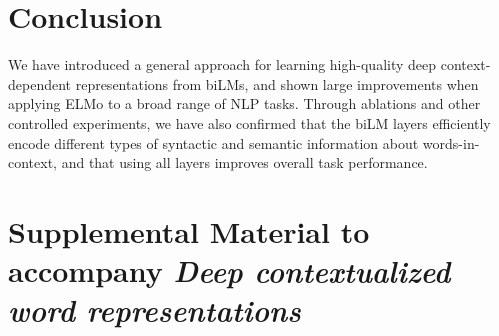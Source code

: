 \documentclass[11pt,a4paper]{article}
\newcommand{\ELMO}{ELMo}
\newcommand{\tinysection}[1]{\textbf{#1}}
\begin{document}
\section{Conclusion}  %
We have introduced a general approach for learning high-quality deep context-dependent representations from biLMs, and shown large improvements when applying \ELMO{} to a broad range of NLP tasks.
Through ablations and other controlled experiments, we have also confirmed that the biLM layers efficiently encode different types of syntactic and semantic information about words-in-context, and that using all layers improves overall task performance.





%




\clearpage
\appendix
\setcounter{page}{1}
\section{Supplemental Material to accompany {\em Deep contextualized word representations}}
\end{document}
